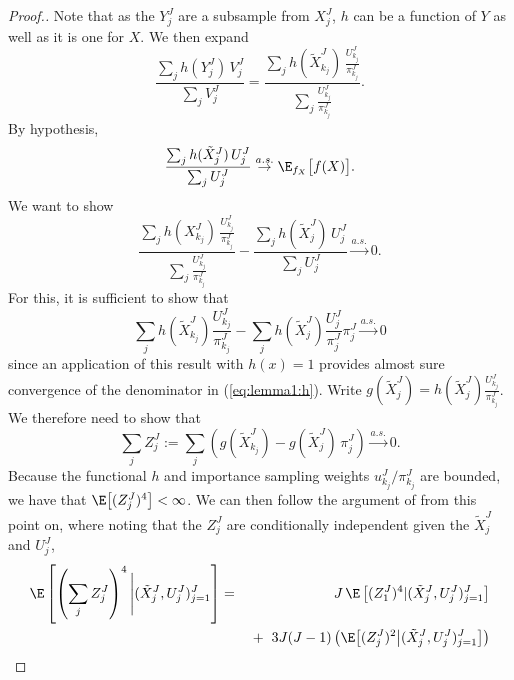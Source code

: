 \begin{proof}[Proof.]
    Note that as the $Y_j^J$ are a subsample from $X_j^J$, $h$ can be a function of $Y$ as well as it is one for $X$. We then expand
    \begin{equation}\frac{\sum_j h(Y_j^J) \, V_j^J}{\sum_j V_j^J} = \frac{\sum_j h(\tilde X_{k_j}^J)\, \frac{U_{k_j}^J}{\pi_{k_j}^J}}{\sum_j \frac{U_{k_j}^J}{\pi_{k_j}^J}}.\end{equation}
    By hypothesis,
    \begin{equation}
    \frac{\sum_j h(\tilde X_j^J)\, U_j^J}{\sum_j U_j^J} \stackrel{a.s.}{\to} \E_{f_X}\big[f(X)\big].
    \end{equation}
    We want to show
    \begin{equation}\label{eq:lemma1:h}
    \frac{\sum_j h(X_{k_j}^J)\, \frac{U_{k_j}^J}{\pi_{k_j}^J}}{\sum_j \frac{U_{k_j}^J}{\pi_{k_j}^J}} - \frac{\sum_j h(\tilde X_j^J)\, U_j^J}{\sum_j U_j^J} \stackrel{a.s.}{\to} 0.
    \end{equation}
    For this, it is sufficient to show that
   \begin{equation} 
   \sum_j h(\tilde X_{k_j}^J)\frac{U_{k_j}^J}{\pi_{k_j}^J}
    -  \sum_j h(\tilde X_j^J)\frac{U_j^J}{\pi_j^J}\pi_j^J \stackrel{a.s.}{\to} 0 
    \end{equation}
    since an application of this result with $h(x)=1$ provides almost sure convergence of the denominator in (\ref{eq:lemma1:h}).
    Write $g(\tilde X_j^J) = h(\tilde X_j^J)\frac{U_{k_j}^J}{\pi_{k_j}^J}$. We therefore need to show that 
    \begin{equation}
    \sum_j Z_j^J := \sum_j \left(g(\tilde X_{k_j}^J) -  g(\tilde X_j^J) \, \pi_j^J \right) \stackrel{a.s.}{\to} 0.
\end{equation}
    Because the functional $h$ and importance sampling weights $u_{k_j}^J/\pi_{k_j}^J$ are bounded, we have that $\E\big[(Z_j^J)^4\big] < \infty$. We can then follow the argument of \cite{chopin20} from this point on, where noting that the $Z_j^J$ are conditionally independent given the $\tilde{X}_j^J$ and $U_j^J$,
    \begin{eqnarray} 
    \E\left[\left(\sum_j Z_j^J\right)^4 \Bigg| (\tilde X_j^J,U_j^J)_{j=1}^J \right] 
    &=& J\, \E\left[(Z_1^J)^4|(\tilde X_j^J,U_j^J)_{j=1}^J\right] 
    \nonumber
    \\
    && \hspace{1mm}+ \hspace{2mm} 3J(J-1)\left(\E\big[(Z_j^J)^2\big|(\tilde X_j^J,U_j^J)_{j=1}^J\big]\right) 
    \\ 

\end{eqnarray}
\end{proof}
